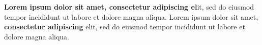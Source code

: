 \textbf{Lorem ipsum dolor sit amet, consectetur adipiscing el}it, sed do eiusmod tempor incididunt ut labore et dolore magna aliqua.
Lorem ipsum dolor sit amet,\textbf{ consectetur adipiscing} elit, sed do eiusmod tempor incididunt ut labore et dolore magna aliqua.
